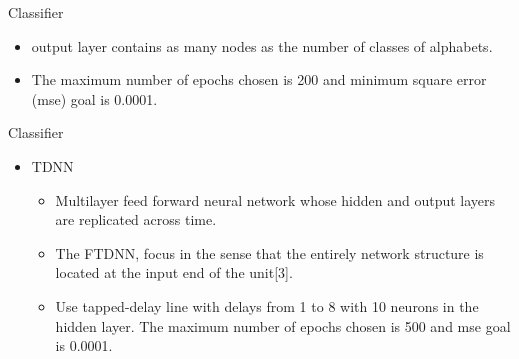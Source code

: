 \documentclass{beamer}
\begin{document}
\begin{frame}{Classifier}
\begin{itemize}

\item output layer contains as many
nodes as the number of classes of alphabets.
\linebreak
\item The maximum number of epochs chosen is 200
and minimum square error (mse) goal is 0.0001.
\linebreak



\end{itemize}
\end{frame}

\begin{frame}{Classifier}
\begin{itemize}
\item TDNN
\begin{itemize}
\item Multilayer feed forward neural network whose hidden and output layers are replicated across time.
\linebreak
\item The FTDNN, focus in the sense that the entirely network structure is located at the input end of the unit[3].
\linebreak
\item Use tapped-delay line with delays from
1 to 8 with 10 neurons in the hidden layer. The maximum
number of epochs chosen is 500 and mse goal is 0.0001.
\end{itemize}


\end{itemize}
\end{frame}
\end{document}
